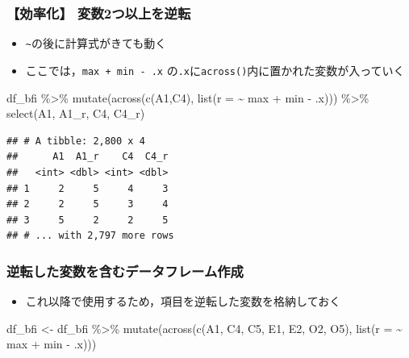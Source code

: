 \documentclass[
  xelatex,ja=standard, b5paper]{bxjsbook}
\newenvironment{Shaded}{\begin{snugshade}}{\end{snugshade}}
\newcommand{\AttributeTok}[1]{\textcolor[rgb]{0.77,0.63,0.00}{#1}}
\newcommand{\FunctionTok}[1]{\textcolor[rgb]{0.00,0.00,0.00}{#1}}
\newcommand{\NormalTok}[1]{#1}
\newcommand{\OtherTok}[1]{\textcolor[rgb]{0.56,0.35,0.01}{#1}}
\newcommand{\SpecialCharTok}[1]{\textcolor[rgb]{0.00,0.00,0.00}{#1}}
\providecommand{\tightlist}{%
  \setlength{\itemsep}{0pt}\setlength{\parskip}{0pt}}
\begin{document}
\hypertarget{mu-rev-rule1}{%
\subsubsection{【効率化】 変数2つ以上を逆転}\label{mu-rev-rule1}}

\begin{itemize}
\tightlist
\item
  \texttt{\textasciitilde{}}の後に計算式がきても動く
\item
  ここでは，\texttt{max\ +\ min\ -\ .x} の\texttt{.x}に\texttt{across()}内に置かれた変数が入っていく
\end{itemize}

\begin{Shaded}
\begin{Highlighting}[]
\NormalTok{df\_bfi }\SpecialCharTok{\%\textgreater{}\%} 
  \FunctionTok{mutate}\NormalTok{(}\FunctionTok{across}\NormalTok{(}\FunctionTok{c}\NormalTok{(A1,C4),}
                \FunctionTok{list}\NormalTok{(}\AttributeTok{r =} \SpecialCharTok{\textasciitilde{}}\NormalTok{ max }\SpecialCharTok{+}\NormalTok{ min }\SpecialCharTok{{-}}\NormalTok{ .x))) }\SpecialCharTok{\%\textgreater{}\%} 
  \FunctionTok{select}\NormalTok{(A1, A1\_r, C4, C4\_r)}
\end{Highlighting}
\end{Shaded}

\begin{verbatim}
## # A tibble: 2,800 x 4
##      A1  A1_r    C4  C4_r
##   <int> <dbl> <int> <dbl>
## 1     2     5     4     3
## 2     2     5     3     4
## 3     5     2     2     5
## # ... with 2,797 more rows
\end{verbatim}

\hypertarget{mu-rev-rule2}{%
\subsubsection{逆転した変数を含むデータフレーム作成}\label{mu-rev-rule2}}

\begin{itemize}
\tightlist
\item
  これ以降で使用するため，項目を逆転した変数を格納しておく
\end{itemize}

\begin{Shaded}
\begin{Highlighting}[]
\NormalTok{df\_bfi }\OtherTok{\textless{}{-}} 
\NormalTok{  df\_bfi }\SpecialCharTok{\%\textgreater{}\%} 
  \FunctionTok{mutate}\NormalTok{(}\FunctionTok{across}\NormalTok{(}\FunctionTok{c}\NormalTok{(A1, C4, C5, E1, E2, O2, O5),}
                \FunctionTok{list}\NormalTok{(}\AttributeTok{r =} \SpecialCharTok{\textasciitilde{}}\NormalTok{ max }\SpecialCharTok{+}\NormalTok{ min }\SpecialCharTok{{-}}\NormalTok{ .x)))}
\end{Highlighting}
\end{Shaded}
\end{document}
